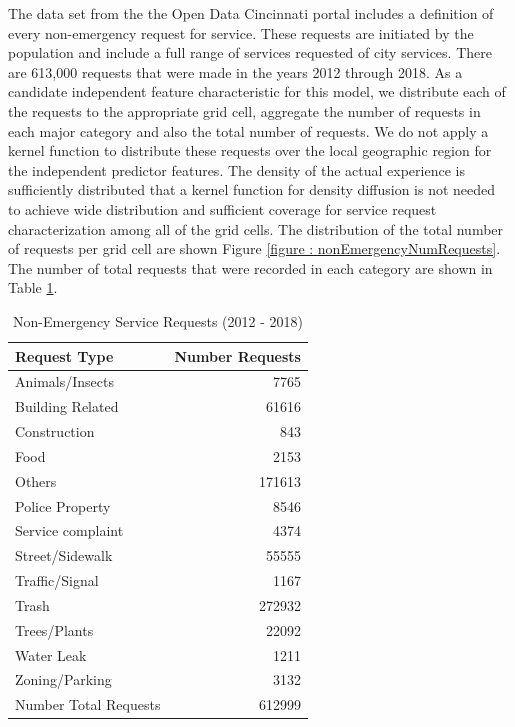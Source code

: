 \documentclass{llncs}
\begin{document}
The data set from the the Open Data Cincinnati portal  includes a definition of every non-emergency request for service. These requests are initiated by the population and include a full range of services requested of city services.  There are 613,000 requests that were made  in the years 2012 through 2018. As a candidate independent feature characteristic for this model, we distribute each of the requests to the appropriate grid cell,  aggregate the number of requests in each major category and also the total number of requests. We do not apply a kernel function to distribute these requests over the local geographic region for the independent predictor features. The density of the actual experience is sufficiently distributed that a kernel function for density diffusion is not needed to achieve wide distribution and sufficient coverage for service request characterization among all of the grid cells. The distribution of the total number of requests per grid cell are shown Figure \ref{figure : nonEmergencyNumRequests}. The number of total requests that were recorded in each category are shown in Table \ref{table : nonEmergencyRequests}.

%

\FloatBarrier
\begin{table}[!h]
\begin{center}
\caption{Non-Emergency Service Requests (2012 - 2018)}
\label{table : nonEmergencyRequests}
\begin{tabular}{lr}
\hline
\rule{0pt}{12pt}
Request Type  	&	Number Requests	\\
\hline
Animals/Insects	&	7765	\\
Building Related	&	61616	\\
Construction	&	843	\\
Food	&	2153	\\
Others	&	171613	\\
Police Property	&	8546	\\
Service complaint	&	4374	\\
Street/Sidewalk	&	55555	\\
Traffic/Signal	&	1167	\\
Trash	&	272932	\\
Trees/Plants	&	22092	\\
Water Leak	&	1211	\\
Zoning/Parking	&	3132	\\
Number Total Requests	&	612999	\\[2pt]
\hline
\end{tabular}
\end{center}
\end{table}
\FloatBarrier
\end{document}
